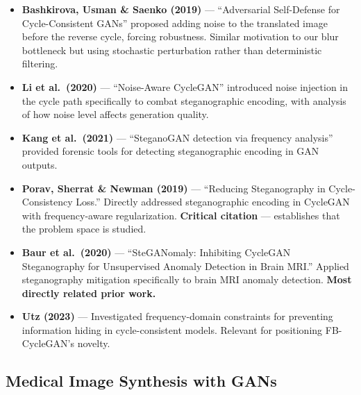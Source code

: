 \documentclass[11pt,a4paper]{article}
\theoremstyle{definition}
\begin{document}
\begin{itemize}
    \item \textbf{Bashkirova, Usman \& Saenko (2019)} --- ``Adversarial Self-Defense for Cycle-Consistent GANs'' proposed adding noise to the translated image before the reverse cycle, forcing robustness. Similar motivation to our blur bottleneck but using stochastic perturbation rather than deterministic filtering.

    \item \textbf{Li et al.\ (2020)} --- ``Noise-Aware CycleGAN'' introduced noise injection in the cycle path specifically to combat steganographic encoding, with analysis of how noise level affects generation quality.

    \item \textbf{Kang et al.\ (2021)} --- ``SteganoGAN detection via frequency analysis'' provided forensic tools for detecting steganographic encoding in GAN outputs.

    \item \textbf{Porav, Sherrat \& Newman (2019)} --- ``Reducing Steganography in Cycle-Consistency Loss.'' Directly addressed steganographic encoding in CycleGAN with frequency-aware regularization. \textbf{Critical citation} --- establishes that the problem space is studied.

    \item \textbf{Baur et al.\ (2020)} --- ``SteGANomaly: Inhibiting CycleGAN Steganography for Unsupervised Anomaly Detection in Brain MRI.'' Applied steganography mitigation specifically to brain MRI anomaly detection. \textbf{Most directly related prior work.}

    \item \textbf{Utz (2023)} --- Investigated frequency-domain constraints for preventing information hiding in cycle-consistent models. Relevant for positioning FB-CycleGAN's novelty.
\end{itemize}

\subsection{Medical Image Synthesis with GANs}
\end{document}

